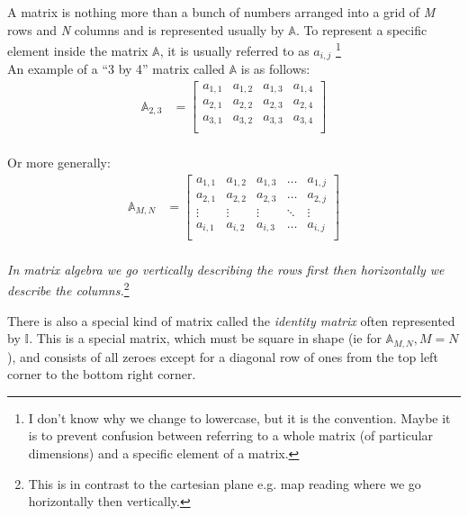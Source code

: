 A matrix is nothing more than a bunch of numbers arranged into a grid of
\emph{M} rows and \emph{N} columns and is represented usually by $\mathbb{A}$.
To represent a specific element inside the matrix $\mathbb{A}$, it is usually
referred to as $a_{i,j}$ \footnote{I don't know why we change to lowercase, but
it is the convention. Maybe it is to prevent confusion between referring to a
whole matrix (of particular dimensions) and a specific element of a matrix.}
\\
An example of a ``3 by 4'' matrix called $\mathbb{A}$ is as follows:
\\
\begin{align}
\mathbb{A}_{2,3} & = 
\begin{bmatrix}
  a_{1,1}   &   a_{1,2}   &   a_{1,3}   &   a_{1,4}   \\
  a_{2,1}   &   a_{2,2}   &   a_{2,3}   &   a_{2,4}   \\
  a_{3,1}   &   a_{3,2}   &   a_{3,3}   &   a_{3,4}   \\
\end{bmatrix}
\end{align}
\\
Or more generally:
\\
\begin{align}
\mathbb{A}_{M,N} & = 
\begin{bmatrix}
  a_{1,1}   &   a_{1,2}   &   a_{1,3}   &   \ldots   &   a_{1,j}   \\
  a_{2,1}   &   a_{2,2}   &   a_{2,3}   &   \ldots   &   a_{2,j}   \\
  \vdots    &   \vdots    &   \vdots    &   \ddots   &   \vdots    \\
  a_{i,1}   &   a_{i,2}   &   a_{i,3}   &   \ldots   &   a_{i,j}   \\
\end{bmatrix}
\label{eq:FormOfMatrices}
\end{align}
\\
\emph{In matrix algebra we go vertically describing the rows first then
horizontally we describe the columns.}\footnote{This is in contrast to the
cartesian plane e.g. map reading where we go horizontally then vertically.}

There is also a special kind of matrix called the \emph{identity matrix} often
represented by $\mathbb{I}$. This is a special matrix, which must be square in
shape (ie for $\mathbb{A}_{M,N}, M = N$), and consists of all zeroes except for
a diagonal row of ones from the top left corner to the bottom right corner.

